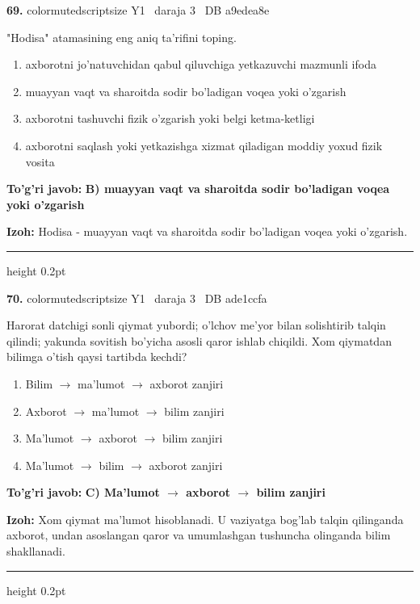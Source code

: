 \documentclass[10pt,a4paper,oneside]{article}
\begin{document}
\noindent\textbf{\color{ink}69.}  {color{muted}scriptsize Y1 \textbullet\ daraja 3 \textbullet\ DB a9edea8e}
\par
"Hodisa" atamasining eng aniq ta'rifini toping.
\begin{enumerate}[label=\Alph*),leftmargin=9mm]
\item axborotni jo'natuvchidan qabul qiluvchiga yetkazuvchi mazmunli ifoda
\item muayyan vaqt va sharoitda sodir bo'ladigan voqea yoki o'zgarish
\item axborotni tashuvchi fizik o'zgarish yoki belgi ketma-ketligi
\item axborotni saqlash yoki yetkazishga xizmat qiladigan moddiy yoxud fizik vosita
\end{enumerate}
\begin{tcolorbox}[enhanced,breakable,colback=teal!4,colframe=teal!50!black,boxrule=0.5pt,arc=1.1mm,left=3mm,right=3mm,top=1.7mm,bottom=1.7mm,before skip=2mm,after skip=2mm]
\textbf{\color{teal}To'g'ri javob:} \textbf{B) muayyan vaqt va sharoitda sodir bo'ladigan voqea yoki o'zgarish}
\par\smallskip
\textbf{Izoh:} Hodisa - muayyan vaqt va sharoitda sodir bo'ladigan voqea yoki o'zgarish.
\end{tcolorbox}
\vspace{2mm}\hrule height 0.2pt \vspace{3mm}

\noindent\textbf{\color{ink}70.}  {color{muted}scriptsize Y1 \textbullet\ daraja 3 \textbullet\ DB ade1ccfa}
\par
Harorat datchigi sonli qiymat yubordi; o'lchov me'yor bilan solishtirib talqin qilindi; yakunda sovitish bo'yicha asosli qaror ishlab chiqildi. Xom qiymatdan bilimga o'tish qaysi tartibda kechdi?
\begin{enumerate}[label=\Alph*),leftmargin=9mm]
\item Bilim \ensuremath{\to} ma'lumot \ensuremath{\to} axborot zanjiri
\item Axborot \ensuremath{\to} ma'lumot \ensuremath{\to} bilim zanjiri
\item Ma'lumot \ensuremath{\to} axborot \ensuremath{\to} bilim zanjiri
\item Ma'lumot \ensuremath{\to} bilim \ensuremath{\to} axborot zanjiri
\end{enumerate}
\begin{tcolorbox}[enhanced,breakable,colback=teal!4,colframe=teal!50!black,boxrule=0.5pt,arc=1.1mm,left=3mm,right=3mm,top=1.7mm,bottom=1.7mm,before skip=2mm,after skip=2mm]
\textbf{\color{teal}To'g'ri javob:} \textbf{C) Ma'lumot \ensuremath{\to} axborot \ensuremath{\to} bilim zanjiri}
\par\smallskip
\textbf{Izoh:} Xom qiymat ma'lumot hisoblanadi. U vaziyatga bog'lab talqin qilinganda axborot, undan asoslangan qaror va umumlashgan tushuncha olinganda bilim shakllanadi.
\end{tcolorbox}
\vspace{2mm}\hrule height 0.2pt \vspace{3mm}
\end{document}
